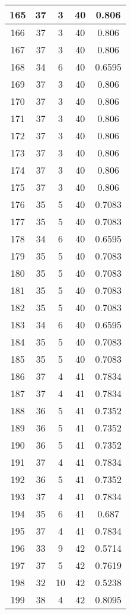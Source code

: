 \documentclass[letterpaper, 12pt]{article}
\begin{document}
\begin{longtable}{|c|c|c|c|c|}
\hline
165 & 37 & 3 & 40 & 0.806 \\
\hline
166 & 37 & 3 & 40 & 0.806 \\
\hline
167 & 37 & 3 & 40 & 0.806 \\
\hline
168 & 34 & 6 & 40 & 0.6595 \\
\hline
169 & 37 & 3 & 40 & 0.806 \\
\hline
170 & 37 & 3 & 40 & 0.806 \\
\hline
171 & 37 & 3 & 40 & 0.806 \\
\hline
172 & 37 & 3 & 40 & 0.806 \\
\hline
173 & 37 & 3 & 40 & 0.806 \\
\hline
174 & 37 & 3 & 40 & 0.806 \\
\hline
175 & 37 & 3 & 40 & 0.806 \\
\hline
176 & 35 & 5 & 40 & 0.7083 \\
\hline
177 & 35 & 5 & 40 & 0.7083 \\
\hline
178 & 34 & 6 & 40 & 0.6595 \\
\hline
179 & 35 & 5 & 40 & 0.7083 \\
\hline
180 & 35 & 5 & 40 & 0.7083 \\
\hline
181 & 35 & 5 & 40 & 0.7083 \\
\hline
182 & 35 & 5 & 40 & 0.7083 \\
\hline
183 & 34 & 6 & 40 & 0.6595 \\
\hline
184 & 35 & 5 & 40 & 0.7083 \\
\hline
185 & 35 & 5 & 40 & 0.7083 \\
\hline
186 & 37 & 4 & 41 & 0.7834 \\
\hline
187 & 37 & 4 & 41 & 0.7834 \\
\hline
188 & 36 & 5 & 41 & 0.7352 \\
\hline
189 & 36 & 5 & 41 & 0.7352 \\
\hline
190 & 36 & 5 & 41 & 0.7352 \\
\hline
191 & 37 & 4 & 41 & 0.7834 \\
\hline
192 & 36 & 5 & 41 & 0.7352 \\
\hline
193 & 37 & 4 & 41 & 0.7834 \\
\hline
194 & 35 & 6 & 41 & 0.687 \\
\hline
195 & 37 & 4 & 41 & 0.7834 \\
\hline
196 & 33 & 9 & 42 & 0.5714 \\
\hline
197 & 37 & 5 & 42 & 0.7619 \\
\hline
198 & 32 & 10 & 42 & 0.5238 \\
\hline
199 & 38 & 4 & 42 & 0.8095 \\
\hline
\end{longtable}
\end{document}
